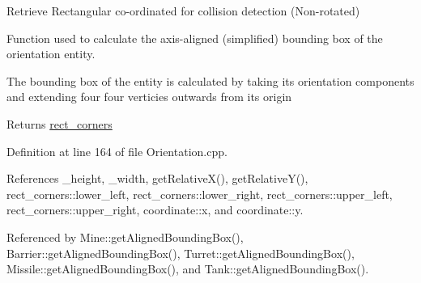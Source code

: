 Retrieve Rectangular co-\/ordinated for collision detection (Non-\/rotated) 

Function used to calculate the axis-\/aligned (simplified) bounding box of the orientation entity.

The bounding box of the entity is calculated by taking its orientation components and extending four four verticies outwards from its origin \begin{DoxyReturn}{Returns}
\hyperlink{structrect__corners}{rect\-\_\-corners} 
\end{DoxyReturn}


Definition at line 164 of file Orientation.\-cpp.



References \-\_\-height, \-\_\-width, get\-Relative\-X(), get\-Relative\-Y(), rect\-\_\-corners\-::lower\-\_\-left, rect\-\_\-corners\-::lower\-\_\-right, rect\-\_\-corners\-::upper\-\_\-left, rect\-\_\-corners\-::upper\-\_\-right, coordinate\-::x, and coordinate\-::y.



Referenced by Mine\-::get\-Aligned\-Bounding\-Box(), Barrier\-::get\-Aligned\-Bounding\-Box(), Turret\-::get\-Aligned\-Bounding\-Box(), Missile\-::get\-Aligned\-Bounding\-Box(), and Tank\-::get\-Aligned\-Bounding\-Box().


